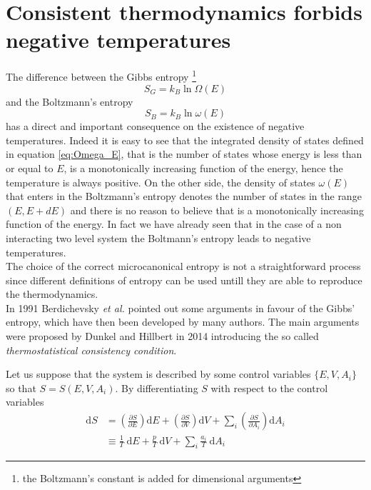 \section{Consistent thermodynamics forbids negative temperatures}
The difference between the Gibbs entropy \footnote{the Boltzmann's constant is added for dimensional arguments}
\begin{equation}
    S_G = k_B \ln \Omega(E)
    \label{eq:gibbs_entropy_formula}
\end{equation}  
and the Boltzmann's entropy 
\begin{equation}
    S_B = k_B \ln \omega(E)
    \label{eq:Boltzmann_entropy_formula}
\end{equation}
has a direct and important consequence on the existence of negative temperatures. Indeed it is easy to see that the integrated density of states defined in equation 
\ref{eq:Omega_E}, that is the number of states whose energy is less than or equal to $E$, is a monotonically increasing function of the energy, hence the temperature is always positive. On the other side,
the density of states $\omega(E)$ that enters in the Boltzmann's entropy denotes the number of states in the range $(E, E+dE)$ and there is no reason to believe that is a monotonically increasing function of the energy. In fact we have already seen
that in the case of a non interacting two level system the Boltmann's entropy leads to negative temperatures. \\
The choice of the correct microcanonical entropy is not a straightforward process since different definitions of entropy can be used untill they are able to reproduce the thermodynamics. \\
In 1991 Berdichevsky \textit{et al.} \cite{original_entropy} pointed out some arguments in favour of the Gibbs' entropy, which have then been developed by many authors. The main arguments were proposed by 
Dunkel and Hillbert in 2014 \cite{Dunkel_Hillbert} introducing the so called \emph{thermostatistical consistency condition}. \par 
\vspace{10pt} 
Let us suppose that the system is described by some control variables $\{E, V, A_i\}$ so that $S = S(E, V, A_i)$. By differentiating $S$ with respect to the control variables 
\begin{equation*}
    \begin{aligned}
        \mathrm{d} S &=\left(\frac{\partial S}{\partial E}\right) \mathrm{d} E+\left(\frac{\partial S}{\partial V}\right) \mathrm{d} V+\sum_{i}\left(\frac{\partial S}{\partial A_{i}}\right) \mathrm{d} A_{i} \\
        & \equiv \frac{1}{T} \mathrm{~d} E+\frac{p}{T} \mathrm{~d} V+\sum_{i} \frac{a_{i}}{T} \mathrm{~d} A_{i}
        \end{aligned}
\end{equation*}
